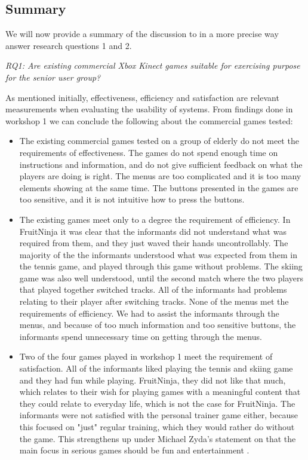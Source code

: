 \subsection{Summary}
We will now provide a summary of the discussion to in a more precise way answer research questions 1 and 2. 

\emph{RQ1: Are existing commercial Xbox Kinect games suitable for exercising purpose for the senior user group?}

As mentioned initially, effectiveness, efficiency  and satisfaction are relevant measurements when evaluating the usability of systems. From findings done in workshop 1 we can conclude the following about the commercial games tested: 
\begin{itemize}
\renewcommand{\labelitemi}{$\bullet$}
\item The existing commercial games tested on a group of elderly do not meet the requirements of effectiveness. The games do not spend enough time on instructions and information, and do not give sufficient feedback on what the players are doing is right. The menus are too complicated and it is too many elements showing at the same time. The buttons presented in the games are too sensitive, and it is not intuitive how to press the buttons. 
\item The existing games meet only to a degree the requirement of efficiency. In FruitNinja it was clear that the informants did not understand what was required from them, and they just waved their hands uncontrollably. The majority of the the informants understood what was expected from them in the tennis game, and played through this game without problems. The skiing game was also well understood, until the second match where the two players that played together switched tracks. All of the informants had problems relating to their player after switching tracks. None of the menus met the requirements of efficiency. We had to assist the informants through the menus, and because of too much information and too sensitive buttons, the informants spend unnecessary time on getting through the menus.
\item Two of the four games played in workshop 1 meet the requirement of satisfaction. All of the informants liked playing the tennis and skiing game and they had fun while playing. FruitNinja, they did not like that much, which relates to their wish for playing games with a meaningful content that they could relate to everyday life, which is not the case for FruitNinja. The informants were not satisfied with the personal trainer game either, because this focused on "just" regular training, which they would rather do without the game. This strengthens up under Michael Zyda's statement on that the main focus in serious games should be fun and entertainment \cite{zyda2005visual}. 
\end{itemize}

